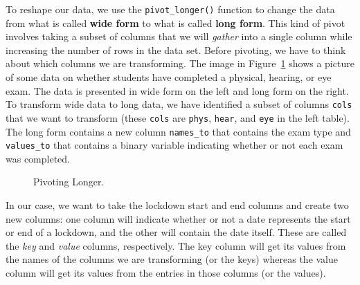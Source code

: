 \documentclass[
  letterpaper,
]{krantz}
\begin{document}
To reshape our data, we use the \texttt{pivot\_longer()} function to
change the data from what is called \textbf{wide form} to what is called
\textbf{long form}. This kind of pivot involves taking a subset of
columns that we will \emph{gather} into a single column while increasing
the number of rows in the data set. Before pivoting, we have to think
about which columns we are transforming. The image in
Figure~\ref{fig-pivot-long} shows a picture of some data on whether
students have completed a physical, hearing, or eye exam. The data is
presented in wide form on the left and long form on the right. To
transform wide data to long data, we have identified a subset of columns
\texttt{cols} that we want to transform (these \texttt{cols} are
\texttt{phys}, \texttt{hear}, and \texttt{eye} in the left table). The
long form contains a new column \texttt{names\_to} that contains the
exam type and \texttt{values\_to} that contains a binary variable
indicating whether or not each exam was completed.

\begin{figure}


\caption{\label{fig-pivot-long}Pivoting Longer.}

\end{figure}%

In our case, we want to take the lockdown start and end columns and
create two new columns: one column will indicate whether or not a date
represents the start or end of a lockdown, and the other will contain
the date itself. These are called the \emph{key} and \emph{value}
columns, respectively. The key column will get its values from the names
of the columns we are transforming (or the keys) whereas the value
column will get its values from the entries in those columns (or the
values).
\end{document}
